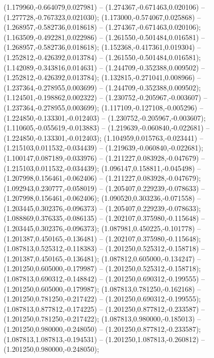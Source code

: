  (1.179960,-0.664079,0.027981) -- (1.274367,-0.671463,0.020106) -- (1.277728,-0.767323,0.021030);
 (1.173000,-0.574067,0.025868) -- (1.268957,-0.582736,0.018618) -- (1.274367,-0.671463,0.020106);
 (1.163509,-0.492281,0.022986) -- (1.261550,-0.501484,0.016581) -- (1.268957,-0.582736,0.018618);
 (1.152368,-0.417361,0.019304) -- (1.252812,-0.426392,0.013784) -- (1.261550,-0.501484,0.016581);
 (1.142089,-0.343816,0.014631) -- (1.244709,-0.352388,0.009502) -- (1.252812,-0.426392,0.013784);
 (1.132815,-0.271041,0.008966) -- (1.237364,-0.278955,0.003699) -- (1.244709,-0.352388,0.009502);
 (1.124501,-0.198862,0.002322) -- (1.230752,-0.205967,-0.003607) -- (1.237364,-0.278955,0.003699);
 (1.117109,-0.127108,-0.005296) -- (1.224850,-0.133301,-0.012403) -- (1.230752,-0.205967,-0.003607);
 (1.110605,-0.055619,-0.013883) -- (1.219639,-0.060840,-0.022681) -- (1.224850,-0.133301,-0.012403);
 (1.104959,0.015763,-0.023441) -- (1.215103,0.011532,-0.034439) -- (1.219639,-0.060840,-0.022681);
 (1.100147,0.087189,-0.033976) -- (1.211227,0.083928,-0.047679) -- (1.215103,0.011532,-0.034439);
 (1.096147,0.158811,-0.045498) -- (1.207998,0.156461,-0.062406) -- (1.211227,0.083928,-0.047679);
 (1.092943,0.230777,-0.058019) -- (1.205407,0.229239,-0.078633) -- (1.207998,0.156461,-0.062406);
 (1.090520,0.303236,-0.071558) -- (1.203445,0.302376,-0.096373) -- (1.205407,0.229239,-0.078633);
 (1.088869,0.376335,-0.086135) -- (1.202107,0.375980,-0.115648) -- (1.203445,0.302376,-0.096373);
 (1.087981,0.450225,-0.101778) -- (1.201387,0.450165,-0.136481) -- (1.202107,0.375980,-0.115648);
 (1.087813,0.525312,-0.118383) -- (1.201250,0.525312,-0.158718) -- (1.201387,0.450165,-0.136481);
 (1.087812,0.605000,-0.134247) -- (1.201250,0.605000,-0.179987) -- (1.201250,0.525312,-0.158718);
 (1.087813,0.690312,-0.148842) -- (1.201250,0.690312,-0.199555) -- (1.201250,0.605000,-0.179987);
 (1.087813,0.781250,-0.162168) -- (1.201250,0.781250,-0.217422) -- (1.201250,0.690312,-0.199555);
 (1.087813,0.877812,-0.174225) -- (1.201250,0.877812,-0.233587) -- (1.201250,0.781250,-0.217422);
 (1.087813,0.980000,-0.185013) -- (1.201250,0.980000,-0.248050) -- (1.201250,0.877812,-0.233587);
 (1.087813,1.087813,-0.194531) -- (1.201250,1.087813,-0.260812) -- (1.201250,0.980000,-0.248050);
